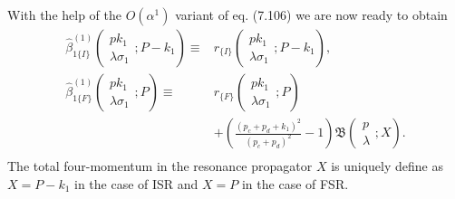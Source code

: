 With the help of the $O(\alpha^1)$ variant of eq. (7.106) we are now ready to obtain 
\begin{align}
\hat{\beta}^{(1)}_{1\{I\}}\left(\begin{array}{c}
pk_1\\\lambda\sigma_1
\end{array};P-k_1\right)\equiv&r_{\{I\}}\left(\begin{array}{c}
pk_1\\\lambda\sigma_1
\end{array};P-k_1\right),\nonumber\\
\hat{\beta}^{(1)}_{1\{F\}}\left(\begin{array}{c}
pk_1\\\lambda\sigma_1
\end{array};P\right)\equiv&r_{\{F\}}\left(\begin{array}{c}
pk_1\\\lambda\sigma_1
\end{array};P\right)\nonumber\\
&+\left(\frac{(p_c+p_d+k_1)^2}{(p_c+p_d)^2}-1\right)\mathfrak{B}\left(\begin{array}{c}
p\\\lambda
\end{array};X\right).\nonumber\\
\end{align}
The total four-momentum in the resonance propagator $X$ is uniquely define as $X=P-k_1$ in the case of ISR and  $X=P$ in the case of FSR.

